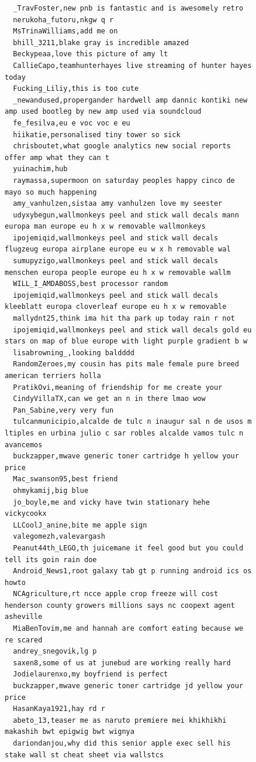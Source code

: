 \begin{figure}[htpb]
\begin{verbatim}
  _TravFoster,new pnb is fantastic and is awesomely retro
  nerukoha_futoru,nkgw q r
  MsTrinaWilliams,add me on
  bhill_3211,blake gray is incredible amazed
  Beckypeaa,love this picture of amy lt
  CallieCapo,teamhunterhayes live streaming of hunter hayes today
  Fucking_Liliy,this is too cute
  _newandused,propergander hardwell amp dannic kontiki new amp used bootleg by new amp used via soundcloud
  fe_fesilva,eu e voc voc e eu
  hiikatie,personalised tiny tower so sick
  chrisboutet,what google analytics new social reports offer amp what they can t
  yuinachim,hub
  raymassa,supermoon on saturday peoples happy cinco de mayo so much happening
  amy_vanhulzen,sistaa amy vanhulzen love my seester
  udyxybegun,wallmonkeys peel and stick wall decals mann europa man europe eu h x w removable wallmonkeys
  ipojemiqid,wallmonkeys peel and stick wall decals flugzeug europa airplane europe eu w x h removable wal
  sumupyzigo,wallmonkeys peel and stick wall decals menschen europa people europe eu h x w removable wallm
  WILL_I_AMDABOSS,best processor random
  ipojemiqid,wallmonkeys peel and stick wall decals kleeblatt europa cloverleaf europe eu h x w removable
  mallydnt25,think ima hit tha park up today rain r not
  ipojemiqid,wallmonkeys peel and stick wall decals gold eu stars on map of blue europe with light purple gradient b w
  lisabrowning_,looking baldddd
  RandomZeroes,my cousin has pits male female pure breed american terriers holla
  PratikOvi,meaning of friendship for me create your
  CindyVillaTX,can we get an n in there lmao wow
  Pan_Sabine,very very fun
  tulcanmunicipio,alcalde de tulc n inaugur sal n de usos m ltiples en urbina julio c sar robles alcalde vamos tulc n avancemos
  buckzapper,mwave generic toner cartridge h yellow your price
  Mac_swanson95,best friend
  ohmykamij,big blue
  jo_boyle,me and vicky have twin stationary hehe vickycookx
  LLCoolJ_anine,bite me apple sign
  valegomezh,valevargash
  Peanut44th_LEGO,th juicemane it feel good but you could tell its goin rain doe
  Android_News1,root galaxy tab gt p running android ics os howto
  NCAgriculture,rt ncce apple crop freeze will cost henderson county growers millions says nc coopext agent asheville
  MiaBenTovim,me and hannah are comfort eating because we re scared
  andrey_snegovik,lg p
  saxen8,some of us at junebud are working really hard
  Jodielaurenxo,my boyfriend is perfect
  buckzapper,mwave generic toner cartridge jd yellow your price
  HasanKaya1921,hay rd r
  abeto_13,teaser me as naruto premiere mei khikhikhi makashih bwt epigwig bwt wignya
  dariondanjou,why did this senior apple exec sell his stake wall st cheat sheet via wallstcs

\end{verbatim}
\end{figure}
